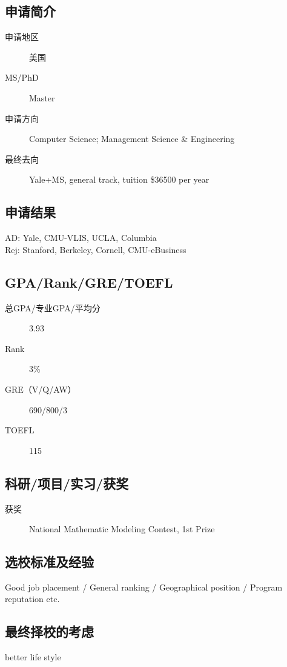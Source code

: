 \documentclass[11pt,fleqn,openany]{book} %
\begin{document}
\noindent\begin{minipage}[t]{0.45\textwidth}
\subsection*{申请简介}
\begin{description}
\item[申请地区] 美国
\item[MS/PhD] Master
\item[申请方向] Computer Science; Management Science \& Engineering
\item[最终去向] Yale+MS, general track, tuition \$36500 per year
\end{description}
\end{minipage}
\hfill
\begin{minipage}[t]{0.45\textwidth}
\subsection*{申请结果}
\noindent AD: Yale, CMU-VLIS, UCLA, Columbia\\
Rej: Stanford, Berkeley, Cornell, CMU-eBusiness
\end{minipage}
\subsection*{GPA/Rank/GRE/TOEFL}
\begin{description}
\item[总GPA/专业GPA/平均分] 3.93
\item[Rank] 3\%
\item[GRE（V/Q/AW）] 690/800/3
\item[TOEFL] 115
\end{description}

\subsection*{科研/项目/实习/获奖}
\begin{description}
\item[获奖] National Mathematic Modeling Contest, 1st Prize
\end{description}
\subsection*{选校标准及经验}
Good job placement / General ranking / Geographical position / Program reputation etc.
\subsection*{最终择校的考虑}
better life style
\clearpage
\cleardoublepage
\end{document}

